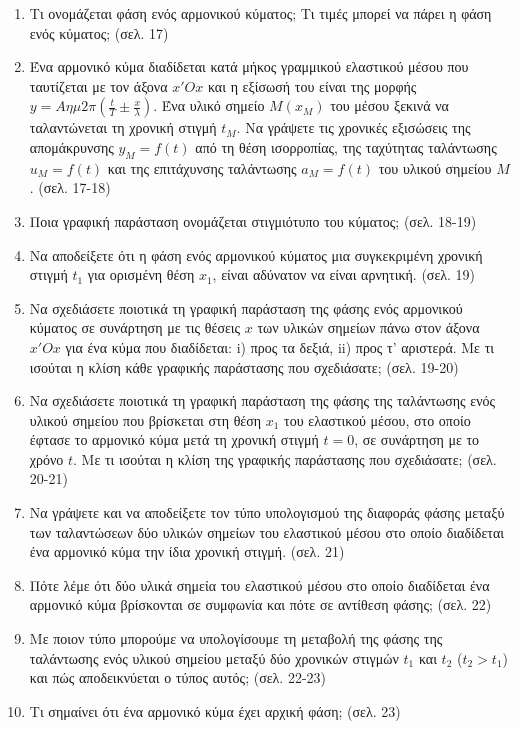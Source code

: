 \documentclass{article}
\begin{document}
\begin{enumerate}
      \item Τι ονομάζεται φάση ενός αρμονικού κύματος; Τι τιμές μπορεί να πάρει η φάση ενός κύματος; (σελ. 17)

      \item Ένα αρμονικό κύμα διαδίδεται κατά μήκος γραμμικού ελαστικού μέσου που ταυτίζεται με τον άξονα $x'Ox$ και η εξίσωσή του είναι της μορφής $y = A\eta\mu 2\pi (\frac{t}{T} \pm \frac{x}{\lambda})$. Ένα υλικό σημείο $M(x_M)$ του μέσου ξεκινά να ταλαντώνεται τη χρονική στιγμή $t_M$. Να γράψετε τις χρονικές εξισώσεις της απομάκρυνσης $y_M = f(t)$ από τη θέση ισορροπίας, της ταχύτητας ταλάντωσης $u_M = f(t)$ και της επιτάχυνσης ταλάντωσης $a_M = f(t)$ του υλικού σημείου $M$. (σελ. 17-18)

      \item Ποια γραφική παράσταση ονομάζεται στιγμιότυπο του κύματος; (σελ. 18-19)

      \item Να αποδείξετε ότι η φάση ενός αρμονικού κύματος μια συγκεκριμένη χρονική στιγμή $t_1$ για ορισμένη θέση $x_1$, είναι αδύνατον να είναι αρνητική. (σελ. 19)

      \item Να σχεδιάσετε ποιοτικά τη γραφική παράσταση της φάσης ενός αρμονικού κύματος σε συνάρτηση με τις θέσεις $x$ των υλικών σημείων πάνω στον άξονα $x'Ox$ για ένα κύμα που διαδίδεται: i) προς τα δεξιά, ii) προς τ' αριστερά. Με τι ισούται η κλίση κάθε γραφικής παράστασης που σχεδιάσατε; (σελ. 19-20)

      \item Να σχεδιάσετε ποιοτικά τη γραφική παράσταση της φάσης της ταλάντωσης ενός υλικού σημείου που βρίσκεται στη θέση $x_1$ του ελαστικού μέσου, στο οποίο έφτασε το αρμονικό κύμα μετά τη χρονική στιγμή $t = 0$, σε συνάρτηση με το χρόνο $t$. Με τι ισούται η κλίση της γραφικής παράστασης που σχεδιάσατε; (σελ. 20-21)

      \item Να γράψετε και να αποδείξετε τον τύπο υπολογισμού της διαφοράς φάσης μεταξύ των ταλαντώσεων δύο υλικών σημείων του ελαστικού μέσου στο οποίο διαδίδεται ένα αρμονικό κύμα την ίδια χρονική στιγμή. (σελ. 21)

      \item Πότε λέμε ότι δύο υλικά σημεία του ελαστικού μέσου στο οποίο διαδίδεται ένα αρμονικό κύμα βρίσκονται σε συμφωνία και πότε σε αντίθεση φάσης; (σελ. 22)

      \item Με ποιον τύπο μπορούμε να υπολογίσουμε τη μεταβολή της φάσης της ταλάντωσης ενός υλικού σημείου μεταξύ δύο χρονικών στιγμών $t_1$ και $t_2$ ($t_2 > t_1$) και πώς αποδεικνύεται ο τύπος αυτός; (σελ. 22-23)

      \item Τι σημαίνει ότι ένα αρμονικό κύμα έχει αρχική φάση; (σελ. 23)
\end{enumerate}
\end{document}
